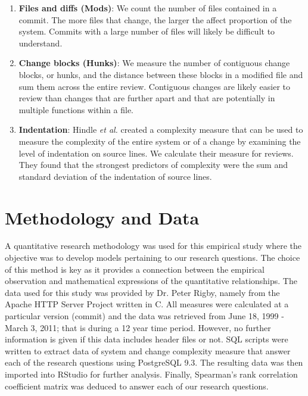 \documentclass[9pt,twocolumn,a4paper]{article}
\begin{document}
\begin{enumerate}

\item{\bf{Files and diffs (Mods)}}: We count the number of files contained in a commit. The more files that change, the larger the affect proportion of the system. Commits with a large number of files will likely be difficult to understand.

\item{\bf{Change blocks (Hunks)}}: We measure the number of contiguous change blocks, or hunks, and the distance between these blocks in a modified file and sum them across the entire review. Contiguous changes are likely easier to review than changes that are further apart and that are potentially in multiple functions within a file.

\item{\bf{Indentation}}: Hindle {\em {et al.}} \cite{Hindle} created a complexity measure that can be used to measure the complexity of the entire system or of a change by examining the level of indentation on source lines. We calculate their measure for reviews. They found that the strongest predictors of complexity were the sum and standard deviation of the indentation of source lines.

\end{enumerate}




\section{Methodology and Data}

A quantitative research methodology was used for this empirical study where the objective was to develop models pertaining to our research questions. The choice of this method is key as it provides a connection between the empirical observation and mathematical expressions of the quantitative relationships. 
The data used for this study was provided by Dr. Peter Rigby, namely from the Apache HTTP Server Project written in C. All measures were calculated at a particular version (commit) and the data was retrieved from June 18, 1999 - March 3, 2011; that is during a 12 year time period. However, no further information is given if this data includes header files or not. SQL scripts were written to extract data of system and change complexity measure that answer each of the research questions using PostgreSQL 9.3. The resulting data was then imported into RStudio for further analysis. Finally, Spearman's rank correlation coefficient matrix was deduced to answer each of our research questions. 
\end{document}
